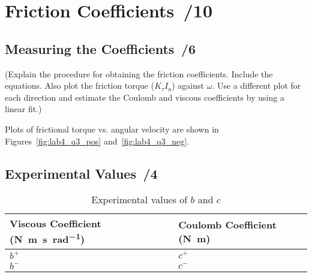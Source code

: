 \documentclass{article}
\newcommand{\score}{\hfill \underline{\hspace{0.65cm}}\,/} %
\begin{document}
\section{Friction Coefficients \score 10}
\subsection{Measuring the Coefficients \score 6}
(Explain the procedure for obtaining the friction coefficients. Include the equations. Also plot the friction torque ($K_{\tau}I_a$) against $\omega$. Use a different plot for each direction and estimate the Coulomb and viscous coefficients by using a linear fit.) 

Plots of frictional torque vs. angular velocity are shown in Figures~\ref{fig:lab4_q3_pos} and~\ref{fig:lab4_q3_neg}.
 

\subsection{Experimental Values \score 4}
\begin{table}[phtb] \label{tbl:lab4_q3}
\begin{center}
\caption{Experimental values of $b$ and $c$}
\begin{tabular}{lr|lr} \hline \hline
\multicolumn{2}{m{2cm}|}{\cellcolor{lightgray} Viscous Coefficient (\si{\newton\meter\second\per\radian})} & \multicolumn{2}{m{2cm}}{\cellcolor{lightgray} Coulomb Coefficient (\si{\newton\meter})} \\
\hline
$b^+$ &  & $c^+$ &  \\ \hline
$b^-$ &  & $c^-$ &  \\ \hline
\end{tabular}
\end{center}
\end{table}
\end{document}
